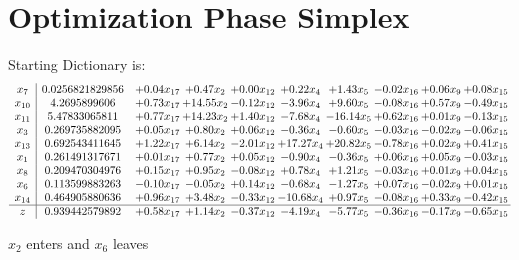 \documentclass[9pt]{article}
\begin{document}
\section{Optimization Phase Simplex}
Starting Dictionary is:
\[\begin{array}{c| c c@{\hskip 2pt} c@{\hskip 2pt} c@{\hskip 2pt} c@{\hskip 2pt} c@{\hskip 2pt} c@{\hskip 2pt} c@{\hskip 2pt} c@{\hskip 2pt} }
 x_{7}   &  0.0256821829856 & +  0.04 x_{17} & +  0.47 x_{2} & +  0.00 x_{12} & +  0.22 x_{4} & +  1.43 x_{5} & -0.02 x_{16} & +  0.06 x_{9} & +  0.08 x_{15}\\
 x_{10}   &  4.2695899606 & +  0.73 x_{17} & + 14.55 x_{2} & -0.12 x_{12} & -3.96 x_{4} & +  9.60 x_{5} & -0.08 x_{16} & +  0.57 x_{9} & -0.49 x_{15}\\
 x_{11}   &  5.47833065811 & +  0.77 x_{17} & + 14.23 x_{2} & +  1.40 x_{12} & -7.68 x_{4} & -16.14 x_{5} & +  0.62 x_{16} & +  0.01 x_{9} & -0.13 x_{15}\\
 x_{3}   &  0.269735882095 & +  0.05 x_{17} & +  0.80 x_{2} & +  0.06 x_{12} & -0.36 x_{4} & -0.60 x_{5} & -0.03 x_{16} & -0.02 x_{9} & -0.06 x_{15}\\
 x_{13}   &  0.692543411645 & +  1.22 x_{17} & +  6.14 x_{2} & -2.01 x_{12} & + 17.27 x_{4} & + 20.82 x_{5} & -0.78 x_{16} & +  0.02 x_{9} & +  0.41 x_{15}\\
 x_{1}   &  0.261491317671 & +  0.01 x_{17} & +  0.77 x_{2} & +  0.05 x_{12} & -0.90 x_{4} & -0.36 x_{5} & +  0.06 x_{16} & +  0.05 x_{9} & -0.03 x_{15}\\
 x_{8}   &  0.209470304976 & +  0.15 x_{17} & +  0.95 x_{2} & -0.08 x_{12} & +  0.78 x_{4} & +  1.21 x_{5} & -0.03 x_{16} & +  0.01 x_{9} & +  0.04 x_{15}\\
 x_{6}   &  0.113599883263 & -0.10 x_{17} & -0.05 x_{2} & +  0.14 x_{12} & -0.68 x_{4} & -1.27 x_{5} & +  0.07 x_{16} & -0.02 x_{9} & +  0.01 x_{15}\\
 x_{14}   &  0.464905880636 & +  0.96 x_{17} & +  3.48 x_{2} & -0.33 x_{12} & -10.68 x_{4} & +  0.97 x_{5} & -0.08 x_{16} & +  0.33 x_{9} & -0.42 x_{15}\\
\hline
z    &  0.939442579892 & +  0.58 x_{17} & +  1.14 x_{2} & -0.37 x_{12} & -4.19 x_{4} & -5.77 x_{5} & -0.36 x_{16} & -0.17 x_{9} & -0.65 x_{15}\\
\end{array}\]


 $ x_{2} $ enters and $ x_{6} $ leaves 
\end{document}
